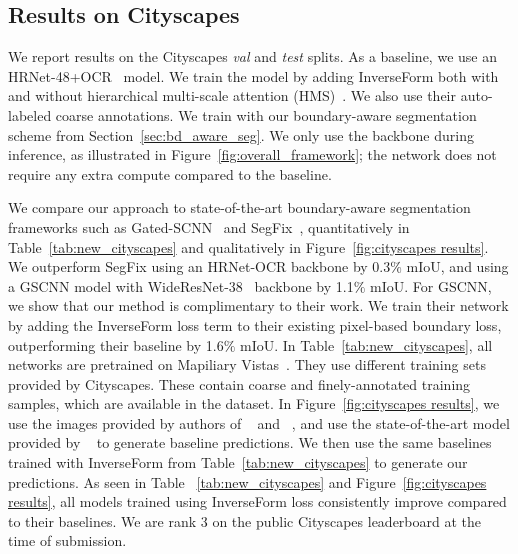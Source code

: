 \documentclass[final]{cvpr}
\begin{document}
\subsection{Results on Cityscapes}
We report results on the Cityscapes \textit{val} and \textit{test} splits. As a baseline, we use an HRNet-48+OCR~\cite{yuan2020objectcontextual} model. We train the model by adding InverseForm both with and without hierarchical multi-scale attention (HMS)~\cite{tao2020hierarchical}. We also use their auto-labeled coarse annotations. We train with our boundary-aware segmentation scheme from Section~\ref{sec:bd_aware_seg}. We only use the backbone during inference, as illustrated in Figure~\ref{fig:overall_framework}; the network does not require any extra compute compared to the baseline.

We compare our approach to state-of-the-art boundary-aware segmentation frameworks such as Gated-SCNN~\cite{takikawa2019gated} and SegFix~\cite{yuan2020segfix}, quantitatively in Table~\ref{tab:new_cityscapes} and qualitatively in Figure~\ref{fig:cityscapes results}. We outperform SegFix using an HRNet-OCR backbone by 0.3$\%$ mIoU, and using a GSCNN model with WideResNet-38~\cite{zagoruyko2017wide} backbone by 1.1$\%$ mIoU. For GSCNN, we show that our method is complimentary to their work. We train their network by adding the InverseForm loss term to their existing pixel-based boundary loss, outperforming their baseline by 1.6$\%$ mIoU. In Table~\ref{tab:new_cityscapes}, all networks are pretrained on Mapiliary Vistas~\cite{mapiliary}. They use different training sets provided by Cityscapes. These contain coarse and finely-annotated training samples, which are available in the dataset. In Figure~\ref{fig:cityscapes results}, we use the images provided by authors of ~\cite{yuan2020segfix} and ~\cite{takikawa2019gated}, and use the state-of-the-art model provided by ~\cite{tao2020hierarchical} to generate baseline predictions. We then use the same baselines trained with InverseForm from Table~\ref{tab:new_cityscapes} to generate our predictions. As seen in Table ~\ref{tab:new_cityscapes} and Figure~\ref{fig:cityscapes results}, all models trained using InverseForm loss consistently improve compared to their baselines. We are rank 3 on the public Cityscapes leaderboard at the time of submission.
\end{document}
